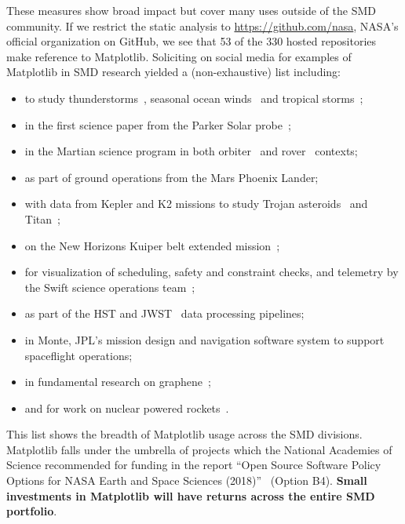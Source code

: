 \documentclass[12pt]{article}
\numberwithin{page}{section}
\begin{document}
These measures show broad impact but cover many uses outside of the
SMD community.  If we restrict the static analysis to
\url{https://github.com/nasa}, NASA's official organization on GitHub,
we see that 53 of the 330 hosted repositories make reference to
Matplotlib.  Soliciting on social media for examples of Matplotlib in SMD research
yielded a (non-exhaustive) list including:
\begin{itemize}[noitemsep]
\item
  to study
  thunderstorms~\cite{https://doi.org/10.1002/2016JD025299,https://doi.org/10.1029/2019JD030874},
  seasonal ocean winds~\cite{https://doi.org/10.1002/2017JD027516} and
  tropical storms~\cite{Lang_2020};
\item in the first science paper from the Parker Solar
  probe~\cite{Bale2019};
\item in the Martian science program in both
  orbiter~\cite{https://doi.org/10.1029/2019JE006188} and
  rover~\cite{https://doi.org/10.1002/2016EA000219} contexts;
\item as part of ground operations from the Mars Phoenix Lander;
\item with data from Kepler and K2 missions to study Trojan
  asteroids~\cite{Nixon_2019} and
  Titan~\cite{Ryan_2017,2019PASP..131h4505P};
\item on the New Horizons Kuiper belt extended
  mission~\cite{Porter_2018};
\item for visualization of scheduling, safety and constraint checks,
  and telemetry by the Swift science operations
  team~\cite{swift_ops,2020ApJ...900...35T};
\item as part of the HST and JWST~\cite{jwst_pipeline} data processing
  pipelines;
\item in Monte, JPL's mission design
  and navigation software system to support spaceflight operations;
\item in fundamental research on graphene~\cite{PhysRevLett.120.236802};
\item and for work on nuclear powered rockets~\cite{leu_cerment}.
\end{itemize}
This list shows the breadth of Matplotlib usage across the SMD
divisions.  Matplotlib falls under the umbrella of projects which the
National Academies of Science recommended for funding in the report
``Open Source Software Policy Options for NASA Earth and Space
Sciences (2018)''~\cite{NAP25217} (Option B4).
\textbf{Small investments in Matplotlib will have returns across the
  entire SMD portfolio}.
\end{document}
